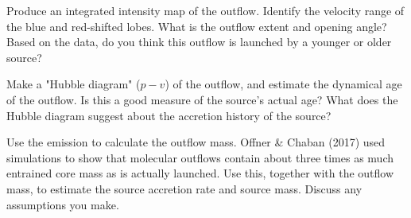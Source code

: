 \documentclass[11pt]{article}
\newenvironment{tight_enumerate}{
    \begin{enumerate}[label=(\alph*)]
    \setlength{\itemsep}{3pt}
    \setlength{\parskip}{0pt}}
    {\end{enumerate}}
\begin{document}
\begin{tight_enumerate}
\item Produce an integrated intensity map of the outflow. Identify the velocity range of the blue and red-shifted lobes. What is the outflow extent and opening angle? Based on the data, do you think this outflow is launched by a younger or older source?

\item Make a "Hubble diagram" ($p{-}v$) of the outflow, and estimate the dynamical age of the outflow. Is this a good measure of the source's actual age? What does the Hubble diagram suggest about the accretion history of the source?

\item Use the  emission to calculate the outflow mass. Offner \& Chaban (2017) used simulations to show that molecular outflows contain about three times as much entrained core mass as is actually launched. Use this, together with the outflow mass, to estimate the source accretion rate and source mass. Discuss any assumptions you make.
\end{tight_enumerate}
\end{document}
